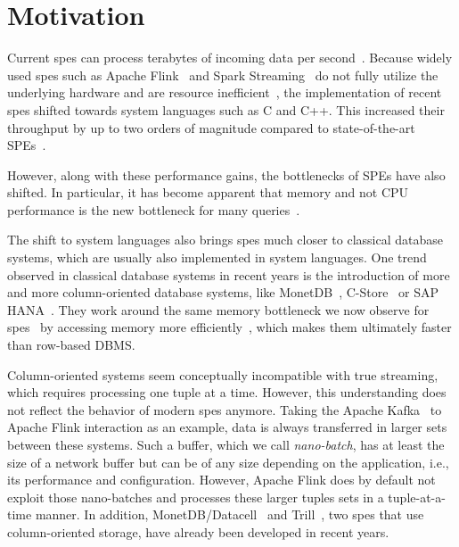 \section{Motivation}
\label{sec:motivation}

Current \acp{spe} can process terabytes of incoming data per second~\cite[]{alibaba}.
Because widely used \acp{spe} such as Apache Flink~\cite{DBLP:journals/debu/CarboneKEMHT15} and Spark Streaming~\cite{DBLP:journals/cacm/ZahariaXWDADMRV16} do not fully utilize the underlying hardware and are resource inefficient~\cite[]{DBLP:conf/icde/ZhangHDZH17,DBLP:journals/pvldb/ZeuchBRMKLRTM19}, the implementation of recent \acp{spe} shifted towards system languages such as C and C++. 
This increased their throughput by up to two orders of magnitude compared to state-of-the-art SPEs~\cite[]{DBLP:journals/pvldb/ZeuchBRMKLRTM19}.

However, along with these performance gains, the bottlenecks of SPEs have also shifted.
In particular, it has become apparent that memory and not CPU performance is the new bottleneck for many queries~\cite[]{bollmeier2021processor}.

The shift to system languages also brings \acp{spe} much closer to classical database systems, which are usually also implemented in system languages.
One trend observed in classical database systems in recent years is the introduction of more and more column-oriented database systems, like MonetDB~\cite[]{DBLP:journals/debu/IdreosGNMMK12,DBLP:conf/cidr/BonczZN05,DBLP:journals/vldb/BonczK99}, C-Store~\cite[]{DBLP:conf/vldb/StonebrakerABCCFLLMOORTZ05} or SAP HANA~\cite[]{DBLP:conf/sigmod/SikkaFLCPB12}.
They work around the same memory bottleneck we now observe for \acp{spe}~\cite[]{DBLP:conf/vldb/BonczMK99} by accessing memory more efficiently~\cite[]{DBLP:conf/sigmod/AbadiMH08}, which makes them ultimately faster than row-based DBMS.

Column-oriented systems seem conceptually incompatible with true streaming, which requires processing one tuple at a time.
However, this understanding does not reflect the behavior of modern \acp{spe} anymore.
Taking the Apache Kafka~\cite{Kreps2011KafkaA} to Apache Flink interaction as an example, data is always transferred in larger sets between these systems.
Such a buffer, which we call \emph{nano-batch}, has at least the size of a network buffer but can be of any size depending on the application, i.e., its performance and configuration.
However, Apache Flink does by default not exploit those nano-batches and processes these larger tuples sets in a tuple-at-a-time manner.
In addition, MonetDB/Datacell~\cite[]{DBLP:journals/pvldb/LiarouIMK12} and Trill~\cite[]{DBLP:journals/pvldb/ChandramouliGBDPTW14}, two \acp{spe} that use column-oriented storage, have already been developed in recent years.

